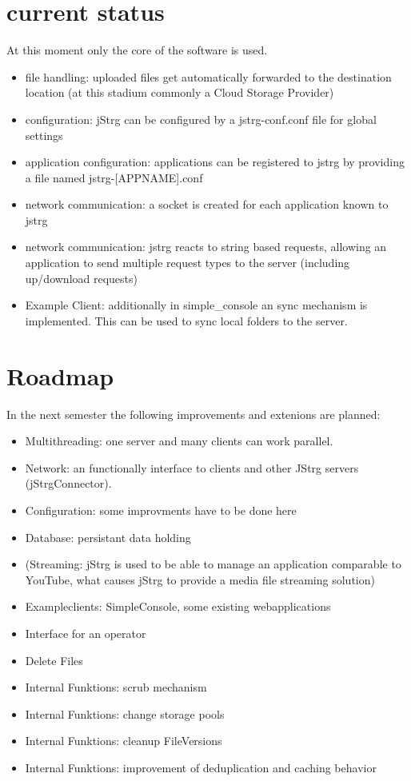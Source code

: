\documentclass
[   oneside,         %
    12pt,            %
    DIV15,           %
    headsepline,     %
    footsepline,     %
    openright,       %
    a4paper,         %
    abstracton,      %
    titlepage,       %
    headinclude,     %
]   {scrreprt}       %
\begin{document}
	\chapter{current status}
	At this moment only the core of the software is used.
    
    \begin{itemize}
	    \item file handling: uploaded files get automatically forwarded to the destination location (at this stadium commonly a Cloud Storage Provider)
	    \item configuration: jStrg can be configured by a jstrg-conf.conf file for global settings
	    \item application configuration: applications can be registered to jstrg by providing a file named jstrg-[APPNAME].conf
	    \item network communication: a socket is created for each application known to jstrg
	    \item network communication: jstrg reacts to string based requests, allowing an application to send multiple request types to the server (including up/download requests)
	    \item Example Client: additionally in simple\_console an sync mechanism is implemented. This can be used to sync local folders to the server. 
	\end{itemize}

	\chapter{Roadmap}
	In the next semester the following improvements and extenions are planned:
	\begin{itemize}
		\item Multithreading: one server and many clients can work parallel.
		\item Network: an functionally interface to clients and other JStrg servers (jStrgConnector).
		\item Configuration: some improvments have to be done here
		\item Database: persistant data holding
		\item (Streaming: jStrg is used to be able to manage an application comparable to YouTube, what causes jStrg to provide a media file streaming solution)
		\item Exampleclients: SimpleConsole, some existing webapplications
		\item Interface for an operator
		\item Delete Files
		\item Internal Funktions: scrub mechanism
		\item Internal Funktions: change storage pools
		\item Internal Funktions: cleanup FileVersions
		\item Internal Funktions: improvement of deduplication and caching behavior
	\end{itemize}
	
\end{document}
